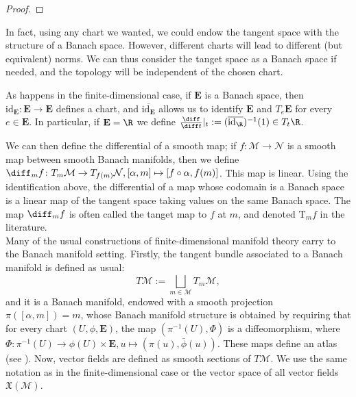 \begin{proof}
\end{proof}

In fact, using any chart we wanted, we could endow the tangent space with the structure of a Banach space. However, different charts will lead to different (but equivalent) norms. We can thus consider the tanget space as a Banach space if needed, and the topology will be independent of the chosen chart.

\begin{obs}
    As happens in the finite-dimensional case, if \(\mathbf{E}\) is a Banach space, then \(\mathrm{id}_{\mathbf{E}}\colon \mathbf{E} \to \mathbf{E}\) defines a chart, and \(\overline{\mathrm{id}_\mathbf{E}}\) allows us to identify \(\mathbf{E}\) and \(T_e\mathbf{E}\) for every \(e \in \mathbf{E}\). In particular, if \(\mathbf{E}=\R\) we define \(\frac{\diff}{\diff t}|_{t}:=(\overline{\mathrm{id}_\R})^{-1}(1)\in T_t\R\).
\end{obs}
We can then define the differential of a smooth map; if \(f \colon \mathcal{M} \to \mathcal{N}\) is a smooth map between smooth Banach manifolds, then we define \(\diff_mf\colon T_m\mathcal{M}\to T_{f(m)}\mathcal{N}, [\alpha, m] \mapsto [f \circ \alpha, f(m)]\). This map is linear. Using the identification above, the differential of a map whose codomain is a Banach space is a linear map of the tangent space taking values on the same Banach space. The map \(\diff_mf\) is often called the tanget map to \(f\) at \(m\), and denoted \(\mathrm{T}_mf\) in the literature. \\

Many of the usual constructions of finite-dimensional manifold theory carry to the Banach manifold setting. Firstly, the tangent bundle associated to a Banach manifold is defined as usual:
\[
T\mathcal{M}:=\bigsqcup_{m\in \mathcal{M}} T_m\mathcal{M},
\]
and it is a Banach manifold, endowed with a smooth projection \(\pi([\alpha, m])=m\), whose Banach manifold structure is obtained by requiring that for every chart \((U, \phi, \mathbf{E})\), the map \((\pi^{-1}(U), \Phi)\) is a diffeomorphism, where \(\Phi\colon \pi^{-1}(U)\to \phi(U) \times \mathbf{E}, u \mapsto(\pi(u), \bar\phi(u))\). These maps define an atlas (see \parencite[Sec. 1.1.5]{Schmeding_2022}). Now, vector fields are defined as smooth sections of \(T\mathcal{M}\). We use the same notation as in the finite-dimensional case or the vector space of all vector fields \(\mathfrak{X}(\mathcal{M})\).

